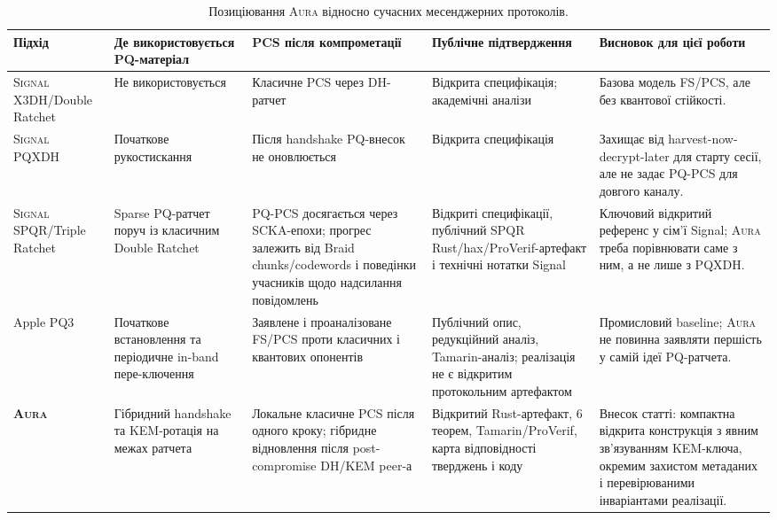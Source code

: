\documentclass[11pt,a4paper]{article}
\theoremstyle{definition}
\newcommand{\Aura}{\mbox{\normalfont\scshape Aura}}
\newcommand{\Signal}{\mbox{\normalfont\scshape Signal}}
\newcommand{\PQXDH}{\textsf{PQXDH}}
\newcommand{\SPQR}{\textsf{SPQR}}
\newcommand{\PQThree}{\textsf{PQ3}}
\begin{document}
\begin{table}[H]
\centering
\caption{Позиціювання \Aura{} відносно сучасних месенджерних
протоколів.}\label{tab:sota-comparison}
\scriptsize
\begin{tabularx}{\textwidth}{@{}p{}p{}p{}p{}X@{}}
\toprule
Підхід & Де використовується PQ-матеріал & PCS після компрометації & Публічне підтвердження & Висновок для цієї роботи \\
\midrule
\Signal{} X3DH/Double Ratchet~\cite{signal-x3dh,signal-double-ratchet} &
Не використовується &
Класичне PCS через DH-ратчет &
Відкрита специфікація; академічні аналізи &
Базова модель FS/PCS, але без квантової стійкості. \\
\addlinespace
\Signal{} \PQXDH{}~\cite{signal-pqxdh} &
Початкове рукостискання &
Після handshake PQ-внесок не оновлюється &
Відкрита специфікація &
Захищає від harvest-now-decrypt-later для старту сесії, але не задає PQ-PCS для довгого каналу. \\
\addlinespace
\Signal{} \SPQR{}/Triple Ratchet~\cite{signal-spqr,signal-double-ratchet,mlkem-braid} &
Sparse PQ-ратчет поруч із класичним Double Ratchet &
PQ-PCS досягається через SCKA-епохи; прогрес залежить від Braid chunks/codewords і поведінки учасників щодо надсилання повідомлень &
Відкриті специфікації, публічний SPQR Rust/hax/ProVerif-артефакт і технічні нотатки Signal &
Ключовий відкритий референс у сім'ї Signal; \Aura{} треба порівнювати саме з ним, а не лише з \PQXDH{}. \\
\addlinespace
Apple \PQThree{}~\cite{apple-pq3,stebila-pq3,linker-pq3} &
Початкове встановлення та періодичне in-band пере-ключення &
Заявлене і проаналізоване FS/PCS проти класичних і квантових опонентів &
Публічний опис, редукційний аналіз, Tamarin-аналіз; реалізація не є відкритим протокольним артефактом &
Промисловий baseline; \Aura{} не повинна заявляти першість у самій ідеї PQ-ратчета. \\
\addlinespace
\textbf{\Aura{}} &
Гібридний handshake та KEM-ротація на межах ратчета &
Локальне класичне PCS після одного кроку; гібридне відновлення після post-compromise DH/KEM peer-а &
Відкритий Rust-артефакт, 6 теорем, Tamarin/ProVerif, карта відповідності тверджень і коду &
Внесок статті: компактна відкрита конструкція з явним зв'язуванням KEM-ключа, окремим захистом метаданих і перевірюваними інваріантами реалізації. \\
\bottomrule
\end{tabularx}
\end{table}
\end{document}
